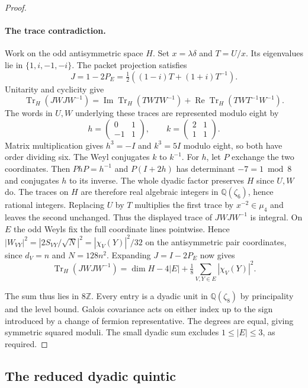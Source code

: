 \documentclass[11pt,a4paper]{article}
\numberwithin{equation}{section}
\begin{document}
\begin{proof}
\paragraph{The trace contradiction.}
Work on the odd antisymmetric space $H$. Set $x=\lambda\delta$
and $T=U/x$. Its eigenvalues lie in $\{1,i,-1,-i\}$. The packet
projection satisfies
\[
 J=1-2P_E=\tfrac12((1-i)T+(1+i)T^{-1}).
\]
Unitarity and cyclicity give
\[
 \operatorname{Tr}_H(JWJW^{-1})
 =\operatorname{Im}\operatorname{Tr}_H(TWTW^{-1})
  +\operatorname{Re}\operatorname{Tr}_H(TWT^{-1}W^{-1}).
\]
The words in $U,W$ underlying these traces are represented modulo
eight by
\[
 h=\begin{pmatrix}0&1\\-1&1\end{pmatrix},\qquad
 k=\begin{pmatrix}2&1\\1&1\end{pmatrix}.
\]
Matrix multiplication gives $h^3=-I$ and $k^3=5I$ modulo eight, so
both have order dividing six. The Weyl conjugates $k$ to $k^{-1}$.
For $h$, let $P$ exchange the two coordinates. Then $PhP=h^{-1}$ and
$P(I+2h)$ has determinant $-7=1\bmod8$ and conjugates $h$ to its
inverse. The whole dyadic factor preserves $H$ since $U,W$ do.
The traces on $H$ are therefore real algebraic integers in
$\mathbb Q(\zeta_6)$, hence rational integers.
Replacing $U$ by $T$ multiplies the first trace by
$x^{-2}\in\mu_4$ and leaves the second unchanged. Thus the
displayed trace of $JWJW^{-1}$ is integral.
On $E$ the odd Weyls fix the full coordinate lines pointwise. Hence
$|W_{VY}|^2=|2S_{VY}/\sqrt N|^2=|\chi_V(Y)|^2/32$ on the
antisymmetric pair coordinates, since $d_V=n$ and $N=128n^2$.
Expanding $J=I-2P_E$ now gives
\[
 \operatorname{Tr}_H(JWJW^{-1})=\dim H-4|E|
              +\tfrac18\sum_{V,Y\in E}|\chi_V(Y)|^2 .
\]

The sum thus lies in $8\mathbb Z$. Every entry is a dyadic unit
in $\mathbb Q(\zeta_8)$ by principality and the level bound. Galois
covariance acts on either index up to the sign introduced by a
change of fermion representative. The degrees are equal, giving
symmetric squared moduli. The small dyadic sum excludes
$1\le|E|\le3$, as required.
\end{proof}

\subsection{The reduced dyadic quintic}
\end{document}
